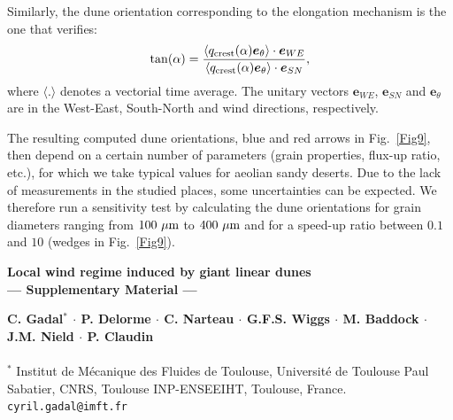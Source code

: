 Similarly, the dune orientation corresponding to the elongation mechanism is the one that verifies:
%
\begin{equation}
\tan(\alpha) = \frac{\langle q_{\textup{crest}}(\alpha) \boldsymbol{e}_{\theta}\rangle \cdot \boldsymbol{e}_{WE} }{ \langle q_{\textup{crest}}(\alpha) \boldsymbol{e}_{\theta} \rangle \cdot \boldsymbol{e}_{SN}},
\end{equation}
%
where $\langle.\rangle$ denotes a vectorial time average. The unitary vectors $\boldsymbol{e}_{WE}$, $\boldsymbol{e}_{SN}$ and $\boldsymbol{e}_{\theta}$ are in the West-East, South-North and wind directions, respectively.

The resulting computed dune orientations, blue and red arrows in Fig.~\ref{Fig9}, then depend on a certain number of parameters (grain properties, flux-up ratio, etc.), for which we take typical values for aeolian sandy deserts. Due to the lack of measurements in the studied places, some uncertainties can be expected. We therefore run a sensitivity test by calculating the dune orientations for grain diameters ranging from $100~\mu\textup{m}$ to $400~\mu\textup{m}$ and for a speed-up ratio between $0.1$ and $10$ (wedges in Fig.~\ref{Fig9}).


\clearpage





\newpage

\renewcommand{\thefigure}{S\arabic{figure}}
\setcounter{figure}{0}

\begin{center}
\textbf{\large
Local wind regime induced by giant linear dunes \\
--- Supplementary Material ---
}
\end{center}

\noindent
\textbf{C. Gadal$^{*}$ $\cdot$ P. Delorme $\cdot$ C. Narteau $\cdot$ G.F.S. Wiggs $\cdot$ M. Baddock $\cdot$ J.M. Nield $\cdot$ P. Claudin}
\\ \\
$^{*}$ Institut de M\'ecanique des Fluides de Toulouse, Universit\'e de Toulouse Paul Sabatier, CNRS, Toulouse INP-ENSEEIHT, Toulouse, France.\\
\texttt{cyril.gadal@imft.fr}

